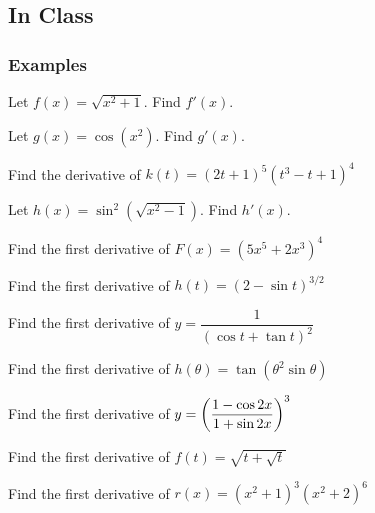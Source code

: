 \documentclass[notes]{subfiles}
\begin{document}
	\subsection*{In Class}
	\subsubsection*{Examples}
		\begin{ex}
			Let \(f(x) = \sqrt{x^2 + 1}\).  Find \(f'(x)\).
		\end{ex}
			
		\begin{ex}
			Let \(g(x) = \cos (x^2)\).  Find \(g'(x)\).
		\end{ex}
			
		\begin{ex}
			Find the derivative of \(k(t) = (2t+1)^5(t^3-t+1)^4\)
		\end{ex}
			\newpage
			
		\begin{ex}
			Let \(h(x) = \sin^2(\sqrt{x^2-1})\).  Find \(h'(x)\).
		\end{ex}
			
		\begin{ex}
			Find the first derivative of \(F(x) = (5x^5+2x^3)^4\)
		\end{ex}
			
		\begin{ex}
			Find the first derivative of \(h(t) = (2-\sin t)^{3/2}\)
		\end{ex}
			
		\begin{ex}
			Find the first derivative of \(y=\dfrac{1}{(\cos t + \tan t)^2}\)
		\end{ex}
			\newpage
		\begin{ex}
			Find the first derivative of \(h(\theta) = \tan (\theta^2\sin\theta)\)
		\end{ex}
			
		\begin{ex}
			Find the first derivative of \(y=\left( \dfrac{1-\cos 2x}{1+\sin 2x}\right)^3\)
		\end{ex}
			
		\begin{ex}
			Find the first derivative of \(f(t) = \sqrt{t+\sqrt{t}}\)
		\end{ex}
			\newpage
			
		\begin{ex}
			Find the first derivative of \(r(x) = (x^2+1)^3(x^2+2)^6\)
		\end{ex}
			
\end{document}
